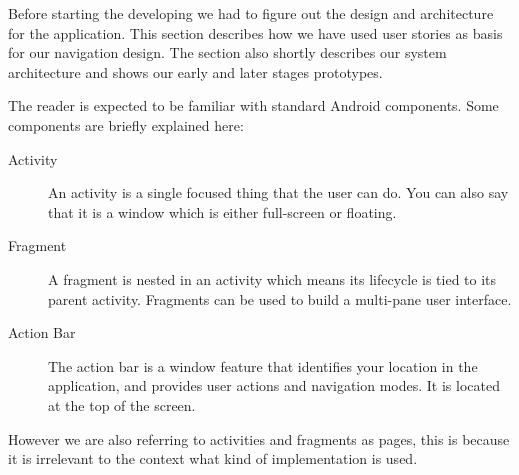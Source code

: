 Before starting the developing we had to figure out the design and architecture for the application. This section describes how we have used user stories as basis for our navigation design. The section also shortly describes our system architecture and shows our early and later stages prototypes.

The reader is expected to be familiar with standard Android components. Some components are briefly explained here:
\begin{description}
\item[Activity] An activity is a single focused thing that the user can do. You can also say that it is a window which is either full-screen or floating. \citep{activity}
\item[Fragment] A fragment is nested in an activity which means its lifecycle is tied to its parent activity. Fragments can be used to build a multi-pane user interface. \citep{fragment}
\item[Action Bar] The action bar is a window feature that identifies your location in the application, and provides user actions and navigation modes. It is located at the top of the screen. \citep{actionbar}
\end{description}

However we are also referring to activities and fragments as pages, this is because it is irrelevant to the context what kind of implementation is used.